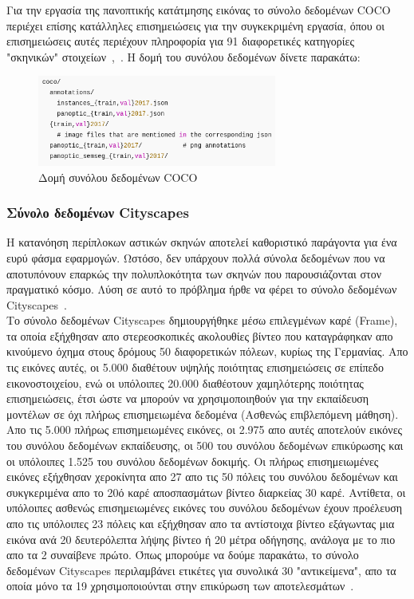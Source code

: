 \documentclass[12pt]{article}
\numberwithin{equation}{section}
\begin{document}
Για την εργασία της πανοπτικής κατάτμησης εικόνας το σύνολο δεδομένων COCO περιέχει επίσης κατάλληλες επισημειώσεις για την συγκεκριμένη εργασία, όπου οι επισημειώσεις αυτές περιέχουν πληροφορία για 91 διαφορετικές κατηγορίες "σκηνικών" στοιχείων~\cite{lin2015microsoftcococommonobjects},~\cite{shah2023coco}. Η δομή του συνόλου δεδομένων δίνετε παρακάτω: \\

\begin{figure}[h!]
  \centering
  \includegraphics[width=0.7\textwidth]{images/coco_format.png} %
  \caption{Δομή συνόλου δεδομένων COCO}
  \label{figure 6}
\end{figure}

\subsubsection{Σύνολο δεδομένων Cityscapes}

Η κατανόηση περίπλοκων αστικών σκηνών αποτελεί καθοριστικό παράγοντα για ένα ευρύ φάσμα εφαρμογών. Ωστόσο, δεν υπάρχουν πολλά σύνολα δεδομένων που να αποτυπόνουν επαρκώς την πολυπλοκότητα των σκηνών που παρουσιάζονται στον πραγματικό κόσμο. Λύση σε αυτό το πρόβλημα ήρθε να φέρει το σύνολο δεδομένων Cityscapes~\cite{DBLP:journals/corr/CordtsORREBFRS16}. \\


Το σύνολο δεδομένων Cityscapes δημιουργήθηκε μέσω επιλεγμένων καρέ (Frame), τα οποία εξήχθησαν απο στερεοσκοπικές ακολουθίες βίντεο που καταγράφηκαν απο κινούμενο όχημα στους δρόμους 50 διαφορετικών πόλεων, κυρίως της Γερμανίας. Απο τις εικόνες αυτές, οι 5.000 διαθέτουν υψηλής ποιότητας επισημειώσεις σε επίπεδο εικονοστοιχείου, ενώ οι υπόλοιπες 20.000 διαθέοτουν χαμηλότερης ποιότητας επισημειώσεις, έτσι ώστε να μπορούν να χρησιμοποιηθούν για την εκπαίδευση μοντέλων σε όχι πλήρως επισημειωμένα δεδομένα (Ασθενώς επιβλεπόμενη μάθηση). Απο τις 5.000 πλήρως επισημειωμένες εικόνες, οι 2.975 απο αυτές αποτελούν εικόνες του συνόλου δεδομένων εκπαίδευσης, οι 500 του συνόλου δεδομένων επικύρωσης και οι υπόλοιπες 1.525 του συνόλου δεδομένων δοκιμής. Οι πλήρως επισημειωμένες εικόνες εξήχθησαν χεροκίνητα απο 27 απο τις 50 πόλεις του συνόλου δεδομένων και συκγκεριμένα απο το 20ό καρέ αποσπασμάτων βίντεο διαρκείας 30 καρέ. Αντίθετα, οι υπόλοιπες ασθενώς επισημειωμένες εικόνες του συνόλου δεδομένων έχουν προέλευση απο τις υπόλοιπες 23 πόλεις και εξήχθησαν απο τα αντίστοιχα βίντεο εξάγωντας μια εικόνα ανά 20 δευτερόλεπτα λήψης βίντεο ή 20 μέτρα οδήγησης, ανάλογα με το πιο απο τα 2 συναίβενε πρώτο. Όπως μπορούμε να δούμε παρακάτω, το σύνολο δεδομένων Cityscapes περιλαμβάνει ετικέτες για συνολικά 30 "αντικείμενα", απο τα οποία μόνο τα 19 χρησιμοποιούνται στην επικύρωση των αποτελεσμάτων~\cite{DBLP:journals/corr/CordtsORREBFRS16}.\\
\end{document}
